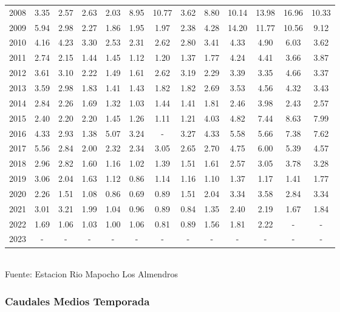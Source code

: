\documentclass{article} %
\begin{document}
\begin{table}[H]
{\begin{tabular}{|c|c|c|c|c|c|c|c|c|c|c|c|c|}
        2008 & 3.35 & 2.57 & 2.63 & 2.03 & 8.95 & 10.77 & 3.62 & 8.80 & 10.14 & 13.98 & 16.96 & 10.33 \\
        2009 & 5.94 & 2.98 & 2.27 & 1.86 & 1.95 & 1.97 & 2.38 & 4.28 & 14.20 & 11.77 & 10.56 & 9.12 \\
        2010 & 4.16 & 4.23 & 3.30 & 2.53 & 2.31 & 2.62 & 2.80 & 3.41 & 4.33 & 4.90 & 6.03 & 3.62 \\
        2011 & 2.74 & 2.15 & 1.44 & 1.45 & 1.12 & 1.20 & 1.37 & 1.77 & 4.24 & 4.41 & 3.66 & 3.87 \\
        2012 & 3.61 & 3.10 & 2.22 & 1.49 & 1.61 & 2.62 & 3.19 & 2.29 & 3.39 & 3.35 & 4.66 & 3.37 \\
        2013 & 3.59 & 2.98 & 1.83 & 1.41 & 1.43 & 1.82 & 1.82 & 2.69 & 3.53 & 4.56 & 4.32 & 3.43 \\
        2014 & 2.84 & 2.26 & 1.69 & 1.32 & 1.03 & 1.44 & 1.41 & 1.81 & 2.46 & 3.98 & 2.43 & 2.57 \\
        2015 & 2.40 & 2.20 & 2.20 & 1.45 & 1.26 & 1.11 & 1.21 & 4.03 & 4.82 & 7.44 & 8.63 & 7.99 \\
        2016 & 4.33 & 2.93 & 1.38 & 5.07 & 3.24 & - & 3.27 & 4.33 & 5.58 & 5.66 & 7.38 & 7.62 \\
        2017 & 5.56 & 2.84 & 2.00 & 2.32 & 2.34 & 3.05 & 2.65 & 2.70 & 4.75 & 6.00 & 5.39 & 4.57 \\
        2018 & 2.96 & 2.82 & 1.60 & 1.16 & 1.02 & 1.39 & 1.51 & 1.61 & 2.57 & 3.05 & 3.78 & 3.28 \\
        2019 & 3.06 & 2.04 & 1.63 & 1.12 & 0.86 & 1.14 & 1.16 & 1.10 & 1.37 & 1.17 & 1.41 & 1.77 \\
        2020 & 2.26 & 1.51 & 1.08 & 0.86 & 0.69 & 0.89 & 1.51 & 2.04 & 3.34 & 3.58 & 2.84 & 3.34 \\
        2021 & 3.01 & 3.21 & 1.99 & 1.04 & 0.96 & 0.89 & 0.84 & 1.35 & 2.40 & 2.19 & 1.67 & 1.84 \\
        2022 & 1.69 & 1.06 & 1.03 & 1.00 & 1.06 & 0.81 & 0.89 & 1.56 & 1.81 & 2.22 & - & - \\
        2023 & - & - & - & - & - & - & - & - & - & - & - & - \\
        \hline
    \end{tabular}%
    }
    \label{tab:caudales_mensuales}
    \vspace{0.2cm}
    \\Fuente: Estacion Rio Mapocho Los Almendros
\end{table}


\newpage
\subsubsection{Caudales Medios Temporada}
\end{document}
